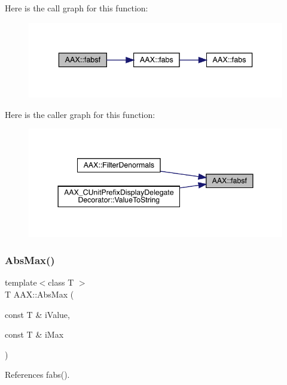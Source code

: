 Here is the call graph for this function\+:
\nopagebreak
\begin{figure}[H]
\begin{center}
\leavevmode
\includegraphics[width=336pt]{a00852_a7fc4d4cd59850b8b875d085467ff5850_cgraph}
\end{center}
\end{figure}
Here is the caller graph for this function\+:
\nopagebreak
\begin{figure}[H]
\begin{center}
\leavevmode
\includegraphics[width=344pt]{a00852_a7fc4d4cd59850b8b875d085467ff5850_icgraph}
\end{center}
\end{figure}
\mbox{\label{a00852_aa4cbb7d8707ad89fc5ba5169ebb75201}} 
\subsubsection{\texorpdfstring{AbsMax()}{AbsMax()}}
{\footnotesize\ttfamily template$<$class T $>$ \\
T A\+A\+X\+::\+Abs\+Max (\begin{DoxyParamCaption}\item[{const T \&}]{i\+Value,  }\item[{const T \&}]{i\+Max }\end{DoxyParamCaption})\hspace{0.3cm}{\ttfamily [inline]}}



References fabs().


